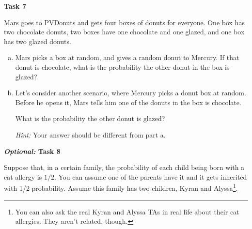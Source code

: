 \documentclass[12pt,letterpaper]{article}
\newenvironment{22enumerate}{\begin{enumerate}[a.]\itemsep0em}{\end{enumerate}}
\begin{document}
\newpage

\textbf{Task 7}

Mars goes to PVDonuts and gets four boxes of donuts for everyone. One box has two chocolate donuts, two boxes have one chocolate and one glazed, and one box has two glazed donuts.

\begin{22enumerate}
\item Mars picks a box at random, and gives a random donut to Mercury. If that donut is chocolate, what is the probability the other donut in the box is glazed?
\begin{mdframed} \vspace{3cm} \end{mdframed}

\item Let's consider another scenario, where Mercury picks a donut box at random. Before he opens it, Mars tells him one of the donuts in the box is chocolate.

What is the probability the other donut is glazed?

\textit{Hint:} Your answer should be different from part a.
\begin{mdframed} \vspace{3cm} \end{mdframed}

\end{22enumerate}

\newpage
\textbf{\textit{Optional: }Task 8}

Suppose that, in a certain family, the probability of each child being born with a cat allergy is $1/2$. You can assume one of the parents have it and it gets inherited with 1/2 probability. Assume this family has two children, Kyran and Alyssa\footnote{You can also ask the real Kyran and Alyssa TAs in real life about their cat allergies. They aren't related, though.}. 
\end{document}
